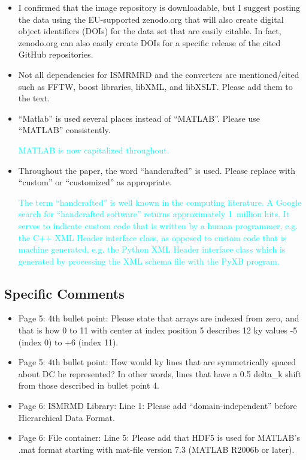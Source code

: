 \documentclass[12pt, draft]{article}
\makeatletter
\def\namedlabel#1#2{\begingroup#2\def\@currentlabel{#2}\phantomsection\label{#1}\endgroup}
\newcommand{\question}[1]{\item[\namedlabel{q#1}{#1}]}
\newcommand{\response}[1]{\textcolor{cyan}{#1}}
\makeatother
\begin{document}
{\begin{itemize}
\question{R2.12} I confirmed that the image repository is downloadable, but I suggest posting the data using the EU-supported zenodo.org that will also create digital object identifiers (DOIs) for the data set that are easily citable. In fact, zenodo.org can also easily create DOIs for a specific release of the cited GitHub repositories.

\question{R2.13} Not all dependencies for ISMRMRD and the converters are mentioned/cited such as FFTW, boost libraries, libXML, and libXSLT. Please add them to the text.

\question{R2.14} ``Matlab'' is used several places instead of ``MATLAB''. Please use ``MATLAB'' consistently.

\response{MATLAB is now capitalized throughout.}

\question{R2.15} Throughout the paper, the word ``handcrafted'' is used. Please replace with ``custom'' or ``customized'' as appropriate.

\response{The term ``handcrafted'' is well known in the computing literature. A Google search for ``handcrafted software'' returns approximately 1~million hits.  It serves to indicate custom code that is written by a human programmer, e.g. the C++ XML Header interface class, as opposed to custom code that is machine generated, e.g. the Python XML Header interface class which is generated by processing the XML schema file with the PyXB program.}

\end{itemize}

\subsection*{Specific Comments}
\begin{itemize}
\question{R2.16} Page 5: 4th bullet point: Please state that arrays are indexed from zero, and that is how 0 to 11 with center at index position 5 describes 12 ky values -5 (index 0) to +6 (index 11).

\question{R2.17} Page 5: 4th bullet point: How would ky lines that are symmetrically spaced about DC be represented? In other words, lines that have a 0.5 delta\_k shift from those described in bullet point 4.

\question{R2.18} Page 6: ISMRMD Library: Line 1: Please add ``domain-independent'' before Hierarchical Data Format.

\question{R2.19} Page 6: File container: Line 5: Please add that HDF5 is used for MATLAB's .mat format starting with mat-file version 7.3 (MATLAB R2006b or later).


\end{itemize}}
\end{document}
